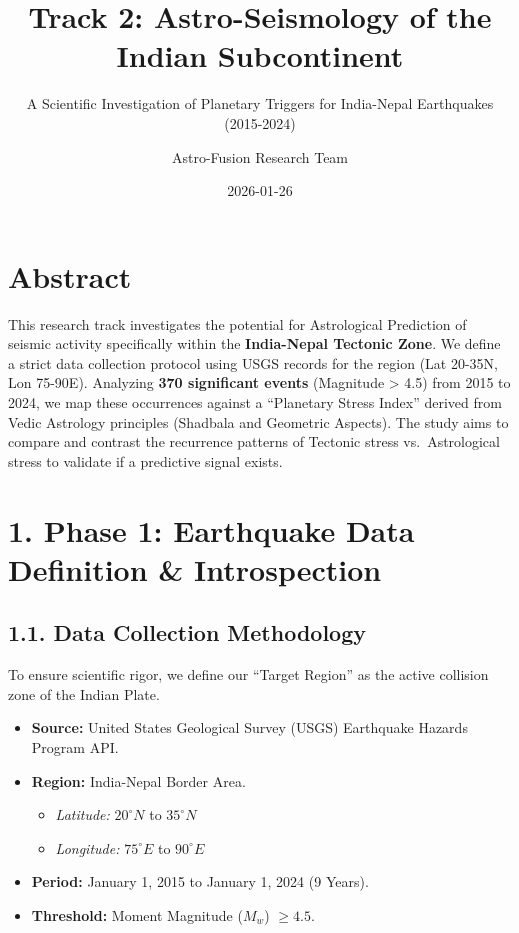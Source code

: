 \documentclass[
  american,
  11pt,
  oneside,
  openany]{scrbook}
\title{Track 2: Astro-Seismology of the Indian Subcontinent}
\subtitle{A Scientific Investigation of Planetary Triggers for
India-Nepal Earthquakes (2015-2024)}
\author{Astro-Fusion Research Team}
\date{2026-01-26}
\providecommand{\tightlist}{%
  \setlength{\itemsep}{0pt}\setlength{\parskip}{0pt}}
\begin{document}
\frontmatter
\maketitle




\mainmatter
\chapter{Abstract}\label{abstract}

This research track investigates the potential for Astrological
Prediction of seismic activity specifically within the
\textbf{India-Nepal Tectonic Zone}. We define a strict data collection
protocol using USGS records for the region (Lat 20-35N, Lon 75-90E).
Analyzing \textbf{370 significant events} (Magnitude \textgreater{} 4.5)
from 2015 to 2024, we map these occurrences against a ``Planetary Stress
Index'' derived from Vedic Astrology principles (Shadbala and Geometric
Aspects). The study aims to compare and contrast the recurrence patterns
of Tectonic stress vs.~Astrological stress to validate if a predictive
signal exists.

\chapter{1. Phase 1: Earthquake Data Definition \&
Introspection}\label{phase-1-earthquake-data-definition-introspection}

\section{1.1. Data Collection
Methodology}\label{data-collection-methodology}

To ensure scientific rigor, we define our ``Target Region'' as the
active collision zone of the Indian Plate.

\begin{itemize}
\tightlist
\item
  \textbf{Source:} United States Geological Survey (USGS) Earthquake
  Hazards Program API.
\item
  \textbf{Region:} India-Nepal Border Area.

  \begin{itemize}
  \tightlist
  \item
    \emph{Latitude:} \(20^\circ N\) to \(35^\circ N\)
  \item
    \emph{Longitude:} \(75^\circ E\) to \(90^\circ E\)
  \end{itemize}
\item
  \textbf{Period:} January 1, 2015 to January 1, 2024 (9 Years).
\item
  \textbf{Threshold:} Moment Magnitude (\(M_w\)) \(\ge 4.5\).
\end{itemize}
\end{document}
